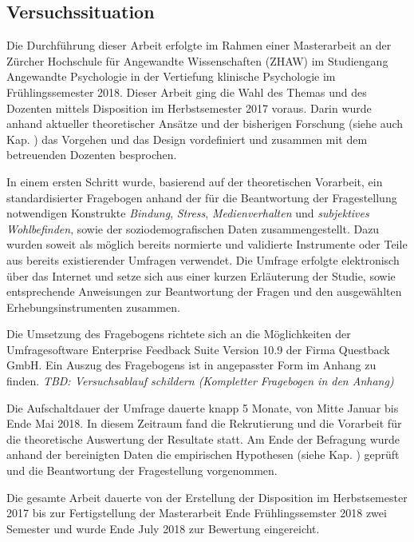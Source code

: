 \subsection{Versuchssituation}\label{sec:Versuchssituation}
Die Durchführung dieser Arbeit erfolgte im Rahmen einer Masterarbeit an der Zürcher Hochschule für Angewandte Wissenschaften (ZHAW) im Studiengang Angewandte Psychologie in der Vertiefung klinische Psychologie im Frühlingssemester 2018. Dieser Arbeit ging die Wahl des Themas und des Dozenten mittels Disposition im Herbstsemester 2017 voraus. Darin wurde anhand aktueller theoretischer Ansätze und der bisherigen Forschung (siehe auch Kap. ) das Vorgehen und das Design vordefiniert und zusammen mit dem betreuenden Dozenten besprochen. 

In einem ersten Schritt wurde, basierend auf der theoretischen Vorarbeit, ein standardisierter Fragebogen anhand der für die Beantwortung der Fragestellung notwendigen Konstrukte \textit{Bindung}, \textit{Stress}, \textit{Medienverhalten} und \textit{subjektives Wohlbefinden}, sowie der soziodemografischen Daten zusammengestellt. Dazu wurden soweit als möglich bereits normierte und validierte Instrumente oder Teile aus bereits existierender Umfragen verwendet. Die Umfrage erfolgte elektronisch über das Internet und setze sich aus einer kurzen Erläuterung der Studie, sowie entsprechende Anweisungen zur Beantwortung der Fragen und den ausgewählten Erhebungsinstrumenten zusammen. 

Die Umsetzung des Fragebogens richtete sich an die Möglichkeiten der Umfragesoftware Enterprise Feedback Suite Version 10.9 der Firma Questback GmbH. Ein Auszug des Fragebogens ist in angepasster Form im Anhang  zu finden. 
\textit{TBD: Versuchsablauf schildern (Kompletter Fragebogen in den Anhang)}

Die Aufschaltdauer der Umfrage dauerte knapp 5 Monate, von Mitte Januar bis Ende Mai 2018. In diesem Zeitraum fand die Rekrutierung und die Vorarbeit für die theoretische Auswertung der Resultate statt. Am Ende der Befragung wurde anhand der bereinigten Daten die empirischen Hypothesen (siehe Kap. ) geprüft und die Beantwortung der Fragestellung vorgenommen.

Die gesamte Arbeit dauerte von der Erstellung der Disposition im Herbstsemester 2017 bis zur Fertigstellung der Masterarbeit Ende Frühlingssemster 2018 zwei Semester und wurde Ende July 2018 zur Bewertung eingereicht.

